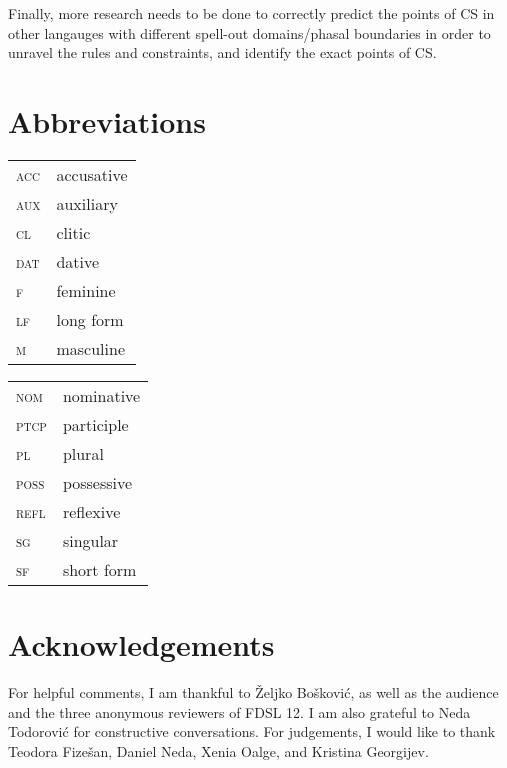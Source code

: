 \documentclass[output=paper,hidelinks,newtxmath,]{langscibook}
\begin{document}
\noindent Finally, more research needs to be done to correctly predict the points of CS in other langauges with different spell-out domains/phasal boundaries in order to unravel the rules and constraints, and identify the exact points of CS.




\section*{Abbreviations}

\begin{tabularx}{.5\textwidth}{@{}lQ@{}}
\textsc{acc}&{accusative}\\
\textsc{aux}&auxiliary\\
\textsc{cl}&{clitic}\\
\textsc{dat}&{dative}\\
\textsc{f}&{feminine}\\
\textsc{lf}&long form\\
\textsc{m}&{masculine}\\
\end{tabularx}%
\begin{tabularx}{.5\textwidth}{@{}lQ@{}}
\textsc{nom}&{nominative}\\
\textsc{ptcp}&{participle}\\
\textsc{pl}&{plural}\\
\textsc{poss}&possessive\\
\textsc{refl}&reflexive\\
\textsc{sg}&singular\\
\textsc{sf}&short form\\
\end{tabularx}

\section*{Acknowledgements}

For helpful comments, I am thankful to Željko Bošković, as well as the audience and the three anonymous reviewers of FDSL 12. I am also grateful to Neda Todorović for constructive conversations. For judgements, I would like to thank Teodora Fizešan, Daniel Neda, Xenia Oalge, and Kristina Georgijev.

\sloppy
\printbibliography[heading=subbibliography,notkeyword=this]
\end{document}
